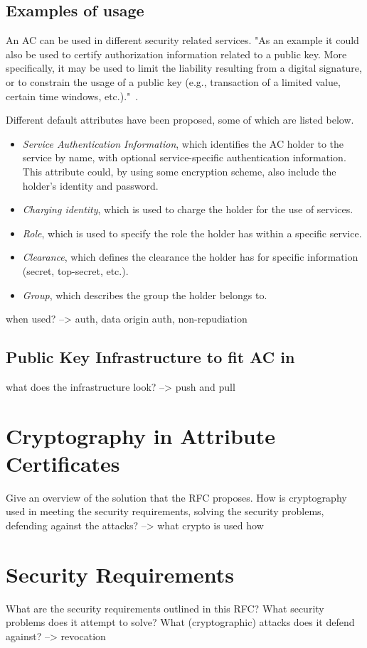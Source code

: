 \documentclass[10pt,conference,a4paper]{IEEEtran}
\begin{document}
\subsection{Examples of usage}
An AC can be used in different security related services. "As an example it could also be used to certify authorization information related to a public key. More specifically, it may be used to limit the liability resulting from a digital signature, or to constrain the usage of a public key (e.g., transaction of a limited value, certain time windows, etc.)."~\cite{tilborg2011encyclopedia}.

Different default attributes have been proposed, some of which are listed below.~\cite{benantar2006access,rfc_ac}
\begin{itemize}
	\item \textit{Service Authentication Information}, which identifies the AC holder to the service by name, with optional service-specific authentication information. This attribute could, by using some encryption scheme, also include the holder's identity and password.
	\item \textit{Charging identity}, which is used to charge the holder for the use of services.
	\item \textit{Role}, which is used to specify the role the holder has within a specific service.
	\item \textit{Clearance}, which defines the clearance the holder has for specific information (secret, top-secret, etc.).
	\item \textit{Group}, which describes the group the holder belongs to.
\end{itemize}

when used? --> auth, data origin auth, non-repudiation

\subsection{Public Key Infrastructure to fit AC in}
what does the infrastructure look? --> push and pull

\section{Cryptography in Attribute Certificates}
\label{cryptography_in_ac}
Give an overview of the solution that the RFC proposes. How is cryptography used in meeting the security requirements, solving the security problems, defending against the attacks?
--> what crypto is used how

\section{Security Requirements}
\label{security_requirements}
What are the security requirements outlined in this RFC? What security problems does it attempt to solve? What (cryptographic) attacks does it defend against?
--> revocation



\end{document}
